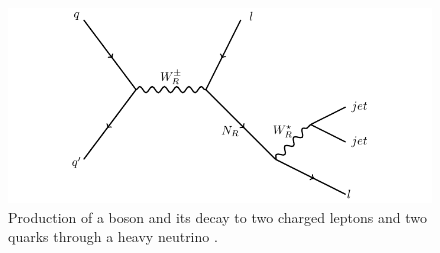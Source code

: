 \begin{figure}[h]
	\centering
	\includegraphics[width=1.0\textwidth]{figures/feynman.pdf}
	\caption{Production of a \WR boson and its decay to two charged leptons and two quarks through 
	a heavy neutrino \nul.}
	\label{fig:wrFeynmanDiagram}
\end{figure}


